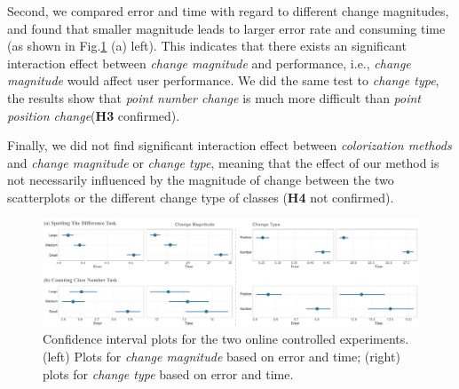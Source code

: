 Second, we compared error and time with regard to different change magnitudes, and found that smaller magnitude leads to larger error rate and consuming time (as shown in Fig.\ref{fig:userResultsVar} (a) left). This indicates that there exists an significant interaction effect between \emph{change magnitude} and performance, i.e., \emph{change magnitude} would affect user performance. We did the same test to \emph{change type}, the results show that \emph{point number change} is much more difficult than \emph{point position change}(\textbf{H3} confirmed).


Finally, we did not find significant interaction effect between \emph{colorization methods} and \emph{change magnitude} or \emph{change type}, meaning that the effect of our method is not necessarily influenced by the magnitude of change between the two scatterplots or the different change type of classes (\textbf{H4} not confirmed).

\begin{figure}[h]
\centering
\includegraphics[width=1\linewidth]{figures/user-result-formal-variables.pdf}
\caption{Confidence interval plots for the two online controlled experiments. (left) Plots for \emph{change magnitude} based on error and time; (right) plots for \emph{change type} based on error and time.
}
\vspace*{-3mm}
\label{fig:userResultsVar}
\end{figure}

